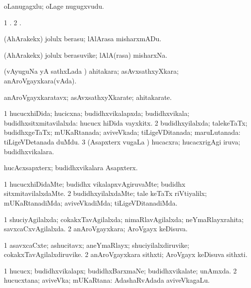 \bentry
{}
\gl{\nA}
\bmng
oLanugagxlu; oLage nugugxvudu. 
\emng
\eentry

\bentry
{}
\gl{\saMkiSx}
\bmng
\bnum
\num{1} . 
\num{2} . 
\enum
\emng
\eentry

\bentry
{}
\gl{\sakirx}
\bmng
(AhArakekx) jolulx berasu; lAlArasa misharxmADu. 
\emng
\eentry

\bentry
{}
\gl{\nA}
\bmng
(AhArakekx) jolulx berasuvike; lAlA(rasa) misharxNa. 
\emng
\eentry

\bentry
{}
\gl{\gu}
\bmng
(vAyuguNa yA sathxLada \vi) ahitakara; asAvxsathxyXkara; anAroVgayxkara(vAda). 
\emng
\eentry

\bentry
{}
\gl{\nA}
\bmng
anAroVgayxkaratavx; asAvxsathxyXkarate; ahitakarate. 
\emng
\eentry

\bentry
{}
\gl{\gu}
\bmng
\bnum
\num{1} hucucxhiDida; hucicxna; budidhxvikalapxda; budidhxvikala; budidhxsitxmitavilalxda:  hucucx hiDida vayxkitx. 
\num{2} budidhxyilalxda; talekeTaTx; budidhxgeTaTx; mUKaRtanada; aviveVkada; tiLigeVDitanada; maruLutanada:  tiLigeVDetanada duMdu. 
\num{3} (Asapxterx \mo vugaLa \vi) hucacxra; hucacxrigAgi iruva; budidhxvikalara. 
\enum
\emng
\eentry

\bentry
{}
\gl{\nA}
\bmng
hucAcxsapxterx; budidhxvikalara Asapxterx. 
\emng
\eentry

\bentry
{}
\gl{\kirxvi}
\bmng
\bnum
\num{1} hucucxhiDidaMte; budidhx vikalapxvAgiruvaMte; budidhx sitxmitavilalxdaMte. 
\num{2} budidhxyilalxdaMte; tale keTaTx riVtiyalilx; mUKaRtanadiMda; aviveVkadiMda; tiLigeVDitanadiMda. 
\enum
\emng
\eentry

\bentry
{}
\gl{\gu}
\bmng
\bnum
\num{1} shuciyAgilalxda; cokakxTavAgilalxda; nimaRlavAgilalxda; neYmaRlayxrahita; savxcaCxvAgilalxda. 
\num{2} anAroVgayxkara; AroVgayx keDisuva. 
\enum
\emng
\eentry

\bentry
{}
\gl{\nA}
\bmng
\bnum
\num{1} asavxcaCxte; ashucitavx; aneYmaRlayx; shuciyilalxdiruvike; cokakxTavAgilalxdiruvike. 
\num{2} anAroVgayxkara sithxti; AroVgayx keDisuva sithxti. 
\enum
\emng
\eentry

\bentry
{}
\gl{\nA}
\bmng
\bnum
\num{1} hucucx; budidhxvikalapx; budidhxBarxmaNe; budidhxvikalate; unAmxda. 
\num{2} hucucxtana; aviveVka; mUKaRtana:  AdashaRvAdada aviveVkagaLu. 
\enum
\emng
\eentry

